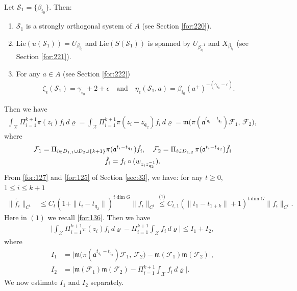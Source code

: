 \documentclass[11 pt]{amsart}
\makeatletter
\newcommand{\namedlabel}[2]{%
  \begingroup
  \def\@currentlabel{#2}%
  \label{#1}%
  \endgroup
}
\newcommand{\norm}[1]{\lVert#1\rVert}
\theoremstyle{definition}
\numberwithin{equation}{section}
\makeatother
\begin{document}
Let $\mathcal{S}_1=\{\beta_{i_0}\}$. Then:
\begin{enumerate}
  \item [$(\mathcal{T}_9)$] \namedlabel{for:227}{$\mathcal{T}_9$} $\mathcal{S}_1$ is a  strongly orthogonal system of $A$ (see Section  \ref{for:220}).

  \smallskip
  \item [$(\mathcal{T}_{10})$]\namedlabel{for:228}{$\mathcal{T}_{10}$}   $\text{Lie}(u(\mathcal{S}_1))=U_{\beta_{i_0}}$ and $\text{Lie}(S(\mathcal{S}_1))$ is spanned by $U_{\beta_{i_0}^{-1}}$ and $X_{\beta_{i_0}}$ (see Section \ref{for:221}).

      \smallskip
  \item [$(\mathcal{T}_{11})$] \namedlabel{for:244}{$\mathcal{T}_{11}$}  For any $a\in A$ (see Section \ref{for:222})
  \begin{align*}
   \zeta_{\epsilon}(\mathcal{S}_1)= \gamma_{i_0}+2+\epsilon\quad\text{and}\quad \eta_\epsilon(\mathcal{S}_1, a)=\beta_{i_0}(a^+)^{-(\gamma_{i_0}-\epsilon)}. \end{align*}



\end{enumerate}
Then we have
\begin{align*}
 \int_{\mathcal{X}} \Pi_{i=1}^{k+1} \pi(z_i)f_i \,d\varrho=\int_{\mathcal{X}} \Pi_{i=1}^{k+1} \pi(z_i-z_{\mathfrak{q}_2})f_i \,d\varrho=\mathfrak{m}\big(\pi(\mathfrak{a}^{t_{ \mathfrak{q}_1}-t_{ \mathfrak{q}_2}})\mathcal{F}_1,\,\mathcal{F}_2\big),
\end{align*}
where
\begin{gather}\label{for:143}
 \mathcal{F}_1=\Pi_{i\in D_{1,1}\cup D_2\cup\{k+1\} } \pi(\mathfrak{a}^{t_{i}-t_{ \mathfrak{q}_1}})\tilde{f}_i,\quad
 \mathcal{F}_2= \Pi_{i\in D_{1,2}}\, \pi(\mathfrak{a}^{t_i-t_{ \mathfrak{q}_2}})\tilde{f}_i\\
 \tilde{f}_i=f_i\circ (w_{z_iz_{\mathfrak{q}_2}^{-1}}).\notag
\end{gather}
From \eqref{for:127} and \eqref{for:125} of Section \ref{sec:33},  we have: for any $t\geq0$, $1\leq i\leq k+1$
\begin{align}\label{for:229}
 \norm{\widetilde{f_i}}_{C^t}&\leq C_t(1+\|t_i-t_{\mathfrak{q}_2}\|)^{t\dim G}\norm{f_i}_{C^t}\overset{\text{(1)}}{\leq} C_{t,1}(\|t_1-t_{1+k}\|+1)^{t\dim G}\norm{f_i}_{C^{t}}.
\end{align}
Here in $(1)$ we recall \eqref{for:136}. Then we have
\begin{align}\label{for:145}
 \Big|\int_{\mathcal{X}} \Pi_{i=1}^{k+1} \pi(z_i)f_i \,d\varrho - \Pi_{i=1}^{k+1} \int_{\mathcal{X}} f_i \,d\varrho\Big|\leq I_1+I_2,
\end{align}
where
\begin{align*}
 I_1&=\Big|\mathfrak{m}\big(\pi(\mathfrak{a}^{t_{ \mathfrak{q}_1}-t_{ \mathfrak{q}_2}})\mathcal{F}_1,\,\mathcal{F}_2\big)-\mathfrak{m}(\mathcal{F}_1)\mathfrak{m}(\mathcal{F}_2)\Big|,\\
 I_2&=\Big|\mathfrak{m}(\mathcal{F}_1)\mathfrak{m}(\mathcal{F}_2)-\Pi_{i=1}^{k+1} \int_{\mathcal{X}} f_i \,d\varrho\Big|.
\end{align*}
We now estimate $I_1$ and $I_2$ separately.
\end{document}
